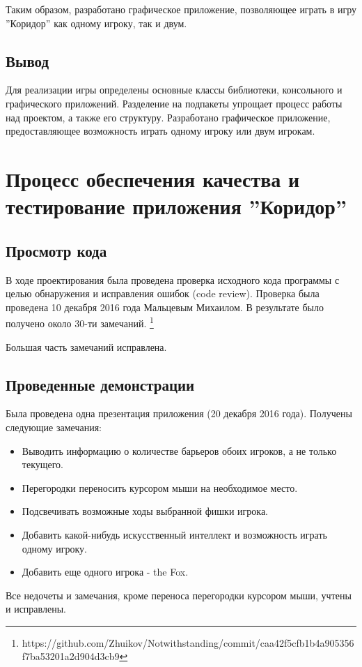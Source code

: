 \documentclass[a4paper]{article}
\begin{document}
Таким образом, разработано графическое приложение, позволяющее играть в игру ''Коридор'' как одному игроку, так и двум.  

\subsection{Вывод}
Для реализации игры определены основные классы библиотеки, консольного и графического приложений. Разделение на подпакеты упрощает процесс работы над проектом, а также его структуру. Разработано графическое приложение, предоставляющее возможность играть одному игроку или двум игрокам.

\section{Процесс обеспечения качества и тестирование приложения ''Коридор''}
\subsection{Просмотр кода}
В ходе проектирования была проведена проверка исходного кода программы с целью обнаружения и исправления ошибок (code review). Проверка была проведена 10 декабря 2016 года Мальцевым Михаилом. В результате было получено около 30-ти замечаний. \footnote{https://github.com/Zhuikov/Notwithstanding/commit/caa42f5cfb1b4a905356f7ba53201a2d904d3cb9}

Большая часть замечаний исправлена. 

\subsection{Проведенные демонстрации}
Была проведена одна презентация приложения (20 декабря 2016 года). Получены следующие замечания:
\begin{itemize}
\item Выводить информацию о количестве барьеров обоих игроков, а не только текущего.
\item Перегородки переносить курсором мыши на необходимое место.
\item Подсвечивать возможные ходы выбранной фишки игрока.
\item Добавить какой-нибудь искусственный интеллект и возможность играть одному игроку. 
\item Добавить еще одного игрока - the Fox.
\end{itemize}

Все недочеты и замечания, кроме переноса перегородки курсором мыши, учтены и исправлены.
\end{document}
